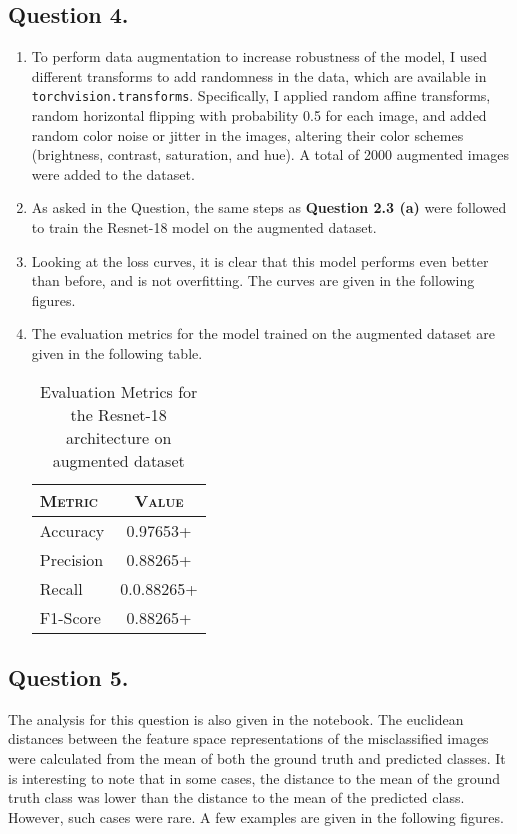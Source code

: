 \documentclass[10pt]{article}
\begin{document}
    \subsection*{\textbf{Question 4.}}
    \begin{enumerate}[label=(\alph*)]
        \item To perform data augmentation to increase robustness of the model, I used different
        transforms to add randomness in the data, which are available in \texttt{torchvision.transforms}.
        Specifically, I applied random affine transforms, random horizontal flipping with probability
        0.5 for each image, and added random color noise or jitter in the images, altering their
        color schemes (brightness, contrast, saturation, and hue). A total of 2000
        augmented images were added to the dataset.
        \item As asked in the Question, the same steps as \textbf{Question 2.3 (a)} were
        followed to train the Resnet-18 model on the augmented dataset.
        \item Looking at the loss curves, it is clear that this model performs even better
        than before, and is not overfitting. The curves are given in the following figures.
        \item The evaluation metrics for the model trained on the augmented dataset are given
        in the following table.
        \begin{table}[h!]
            \centering
            \begin{tabular}{l|c}
                \textsc{Metric} & \textsc{Value} \\
                \hline
                Accuracy & 0.97653+ \\
                Precision & 0.88265+ \\
                Recall & 0.0.88265+ \\
                F1-Score & 0.88265+
            \end{tabular}
            \caption{Evaluation Metrics for the Resnet-18 architecture on augmented dataset}
        \end{table}
    \end{enumerate}

    \subsection*{\textbf{Question 5.}}
    The analysis for this question is also given in the notebook. The euclidean distances
    between the feature space representations of the misclassified images were calculated
    from the mean of both the ground truth and predicted classes. It is interesting to note
    that in some cases, the distance to the mean of the ground truth class was lower than
    the distance to the mean of the predicted class. However, such cases were rare.
    A few examples are given in the following figures.
\end{document}
